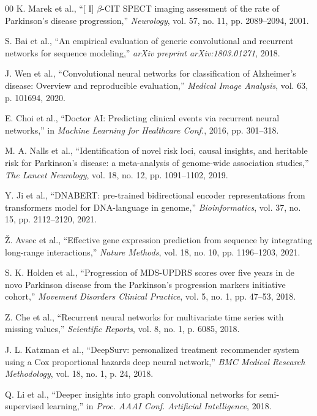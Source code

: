 \documentclass[conference]{IEEEtran}
\begin{document}
{{{\begin{thebibliography}{00}
K. Marek et al., ``[ I] $\beta$-CIT SPECT imaging assessment of the rate of Parkinson's disease progression,'' \textit{Neurology}, vol. 57, no. 11, pp. 2089--2094, 2001.

S. Bai et al., ``An empirical evaluation of generic convolutional and recurrent networks for sequence modeling,'' \textit{arXiv preprint arXiv:1803.01271}, 2018.

J. Wen et al., ``Convolutional neural networks for classification of Alzheimer's disease: Overview and reproducible evaluation,'' \textit{Medical Image Analysis}, vol. 63, p. 101694, 2020.

E. Choi et al., ``Doctor AI: Predicting clinical events via recurrent neural networks,'' in \textit{Machine Learning for Healthcare Conf.}, 2016, pp. 301--318.

M. A. Nalls et al., ``Identification of novel risk loci, causal insights, and heritable risk for Parkinson's disease: a meta-analysis of genome-wide association studies,'' \textit{The Lancet Neurology}, vol. 18, no. 12, pp. 1091--1102, 2019.

Y. Ji et al., ``DNABERT: pre-trained bidirectional encoder representations from transformers model for DNA-language in genome,'' \textit{Bioinformatics}, vol. 37, no. 15, pp. 2112--2120, 2021.

Ž. Avsec et al., ``Effective gene expression prediction from sequence by integrating long-range interactions,'' \textit{Nature Methods}, vol. 18, no. 10, pp. 1196--1203, 2021.

S. K. Holden et al., ``Progression of MDS-UPDRS scores over five years in de novo Parkinson disease from the Parkinson's progression markers initiative cohort,'' \textit{Movement Disorders Clinical Practice}, vol. 5, no. 1, pp. 47--53, 2018.

Z. Che et al., ``Recurrent neural networks for multivariate time series with missing values,'' \textit{Scientific Reports}, vol. 8, no. 1, p. 6085, 2018.

J. L. Katzman et al., ``DeepSurv: personalized treatment recommender system using a Cox proportional hazards deep neural network,'' \textit{BMC Medical Research Methodology}, vol. 18, no. 1, p. 24, 2018.

Q. Li et al., ``Deeper insights into graph convolutional networks for semi-supervised learning,'' in \textit{Proc. AAAI Conf. Artificial Intelligence}, 2018.


\end{thebibliography}}}}
\end{document}
